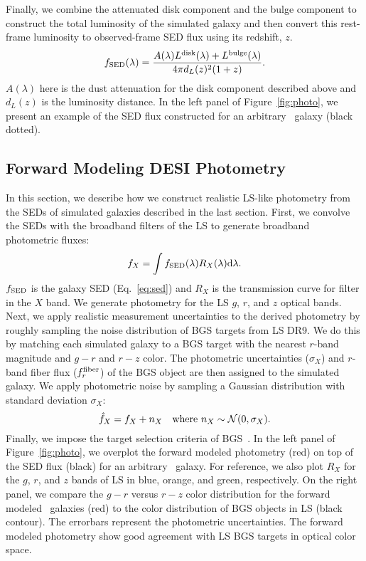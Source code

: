 Finally, we combine the attenuated disk component and the bulge component to
construct the total luminosity of the simulated galaxy and then convert this
rest-frame luminosity to observed-frame SED flux using its redshift, $z$.
\begin{equation}\label{eq:sed} 
    f_{\rm SED}(\lambda) = \frac{A(\lambda)L^{\rm disk}(\lambda) + L^{\rm bulge}(\lambda)}{4 \pi d_L(z)^2 (1+z)}.
\end{equation}
$A(\lambda)$ here is the dust attenuation for the disk component described
above and $d_L(z)$ is the luminosity distance.
In the left panel of Figure~\ref{fig:photo}, we present an example of the SED
flux constructed for an arbitrary \lgal~galaxy (black dotted).

\subsection{Forward Modeling DESI Photometry} \label{sec:photo} 
In this section, we describe how we construct realistic LS-like photometry
from the SEDs of simulated galaxies described in the last section.
First, we convolve the SEDs with the broadband filters of the LS to generate
broadband photometric fluxes: 
\begin{equation} \label{eq:photo}
    f_X = \int f_{\rm SED}(\lambda) R_X(\lambda) {\rm d}\lambda.
\end{equation}
$f_{\rm SED}$ is the galaxy SED (Eq.~\ref{eq:sed}) and $R_X$ is the
transmission curve for filter in the $X$ band. 
We generate photometry for the LS $g$, $r$, and $z$ optical bands.
Next, we apply realistic measurement uncertainties to the derived photometry by
roughly sampling the noise distribution of BGS targets from LS DR9. 
We do this by matching each simulated galaxy to a BGS target with the nearest 
$r$-band magnitude and $g-r$ and $r-z$ color.
The photometric uncertainties ($\sigma_X$) and $r$-band fiber flux ($f_r^{\rm
fiber}$) of the BGS object are then assigned to the simulated galaxy. 
We apply photometric noise by sampling a Gaussian distribution with standard
deviation $\sigma_X$: 
\begin{equation}
    \hat{f}_X = f_X + n_X  \quad {\rm where}~n_X \sim \mathcal{N}(0, \sigma_X).
\end{equation} 
Finally, we impose the target selection criteria of BGS~\citep[][Hahn~\etal~in
prep.]{ruiz-macias2021}.
In the left panel of Figure~\ref{fig:photo}, we overplot the forward
modeled photometry (red) on top of the SED flux (black) for an arbitrary
\lgal~galaxy. 
For reference, we also plot $R_X$ for the $g$, $r$, and $z$ bands of LS in
blue, orange, and green, respectively. 
On the right panel, we compare the $g - r$ versus $r - z$ color distribution
for the forward modeled \lgal~galaxies (red) to the color distribution of BGS
objects in LS (black contour). 
The errorbars represent the photometric uncertainties. 
The forward modeled photometry show good agreement with LS BGS targets in
optical color space.

